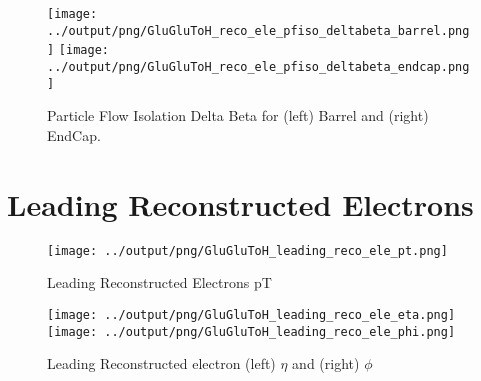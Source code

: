 \documentclass[11pt]{book}
\begin{document}
\begin{figure}[ht]
\centering
\texttt{[image: ../output/png/GluGluToH\_reco\_ele\_pfiso\_deltabeta\_barrel.png]}
\texttt{[image: ../output/png/GluGluToH\_reco\_ele\_pfiso\_deltabeta\_endcap.png]}
\caption{Particle Flow Isolation Delta Beta for (left) Barrel and (right) EndCap.}
\label{fig:gluglu_reco_ele_pfiso_deltabeta_regions}
\end{figure}

\clearpage


\section{Leading Reconstructed Electrons}

\begin{figure}[ht]
\centering
\texttt{[image: ../output/png/GluGluToH\_leading\_reco\_ele\_pt.png]}
\caption{Leading Reconstructed Electrons pT}
\label{fig:gluglu_leading_reco_ele_pt}
\end{figure}

\begin{figure}[ht]
\centering
\texttt{[image: ../output/png/GluGluToH\_leading\_reco\_ele\_eta.png]}
\texttt{[image: ../output/png/GluGluToH\_leading\_reco\_ele\_phi.png]}
\caption{Leading Reconstructed electron (left) $\eta$ and (right) $\phi$}
\label{fig:gluglu_leading_reco_ele_eta_phi}
\end{figure}


 
\end{document}
